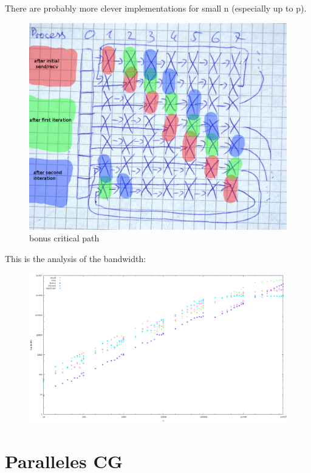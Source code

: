 \documentclass[a4paper,10pt]{article}
\begin{document}
\begin{itemize}
There are probably more clever implementations for small n (especially up to p).
\begin{figure}[h!]
 \centering
 \includegraphics[width=0.8 \textwidth]{09/bonus_critical_path.png}
\caption{bonus critical path}
\end{figure}
\end{itemize}

This is the analysis of the bandwidth:

\begin{figure}[h!]
 \centering
 \includegraphics[width=1.1 \textwidth]{09/bandwidth.png}
\end{figure}

\section{Paralleles CG}
\end{document}
